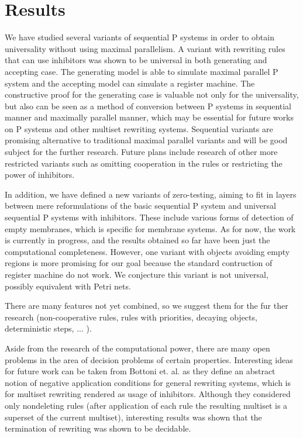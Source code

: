 \documentclass[a4paper,12pt,oneside,openany]{article}
\begin{document}
\section*{Results}
We have studied several variants of sequential P systems in order to
obtain universality without using maximal parallelism. A variant with
rewriting rules that can use inhibitors was shown to be universal in both
generating and accepting case. The generating model is able to simulate
maximal parallel P system and the accepting model can simulate a
register machine. The constructive proof for the generating case is
valuable not only for the universality, but also can be seen as a method
of conversion between P systems in sequential manner and maximally
parallel manner, which may be essential for future works on P systems
and other multiset rewriting systems. Sequential variants are promising
alternative to traditional maximal parallel variants and will be good
subject for the further research. Future plans include research of other
more restricted variants such as omitting cooperation in the rules or
restricting the power of inhibitors.

In addition, we have defined a new variants of zero-testing, aiming to fit
in layers between mere reformulations of the basic sequential P system
and universal sequential P systems with inhibitors. These include various
forms of detection of empty membranes, which is specific for membrane
systems. As for now, the work is currently in progress, and the results
obtained so far have been just the computational completeness.
However, one variant with objects avoiding empty regions is more
promising for our goal because the standard contruction of register
machine do not work. We conjecture this variant is not universal, possibly
equivalent with Petri nets.

There are many features not yet combined, so we suggest them for the
fur ther research (non-cooperative rules, rules with priorities, decaying
objects, deterministic steps, ... ).

Aside from the research of the computational power, there are many
open problems in the area of decision problems of certain properties.
Interesting ideas for future work can be taken from Bottoni et. al. as they
define an abstract notion of negative application conditions for general
rewriting systems, which is for multiset rewriting rendered as usage of
inhibitors. Although they considered only nondeleting rules (after
application of each rule the resulting multiset is a superset of the current
multiset), interesting results was shown that the termination of rewriting
was shown to be decidable.
\end{document}
